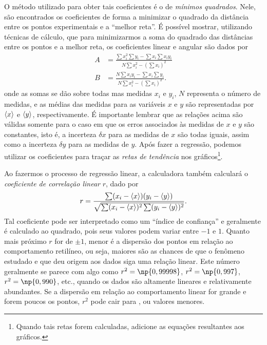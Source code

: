 O método utilizado para obter tais coeficientes é o de \emph{mínimos quadrados}. Nele, são encontrados os coeficientes de forma a minimizar o quadrado da distância entre os pontos experimentais e a ``melhor reta''. É possível mostrar\cite{Taylor}, utilizando técnicas de cálculo, que para minimizarmos a soma do quadrado das distâncias entre os pontos e a melhor reta, os coeficientes linear e angular são dados por
\begin{align}
	A &= \frac{\sum x_i^2 \sum y_i - \sum x_i \sum x_iy_i}{N \sum x_i^2 - (\sum x_i)^2} \\
	B &= \frac{N\sum x_iy_i - \sum x_i \sum y_i}{N \sum x_i^2 - (\sum x_i)^2}.
\end{align}
%
onde as somas se dão sobre todas mas medidas $x_i$ e $y_i$, $N$ representa o número de medidas, e as médias das medidas para as variáveis $x$ e $y$ são representadas por $\left\langle{x}\right\rangle$ e $\left\langle{y}\right\rangle$, respectivamente. É importante lembrar que as relações acima são válidas somente para o caso em que os erros associados às medidas de $x$ e $y$ são constantes, isto é, a incerteza $\delta x$ para as medidas de $x$ são todas iguais, assim como a incerteza $\delta y$ para as medidas de $y$. Após fazer a regressão, podemos utilizar os coeficientes para traçar as \emph{retas de tendência} nos gráficos\footnote{Quando tais retas forem calculadas, adicione as equações resultantes aos gráficos.}.

Ao fazermos o processo de regressão linear, a calculadora também calculará o \emph{coeficiente de correlação linear} $r$, dado por
\begin{equation}
	r = \frac{\sum (x_i - \left\langle{x}\right\rangle)(y_i-\left\langle{y}\right\rangle)}{\sqrt{\sum(x_i - \left\langle{x}\right\rangle)^2\sum (y_i - \left\langle{y}\right\rangle)^2}}.
\end{equation}
%
Tal coeficiente pode ser interpretado como um ``índice de confiança'' e geralmente é calculado ao quadrado, pois seus valores podem variar entre $-1$ e $1$. Quanto mais próximo $r$ for de $\pm 1$, menor é a dispersão dos pontos em relação ao comportamento retilíneo, ou seja, maiores são as chances de que o fenômeno estudado e que deu origem aos dados siga uma relação linear. Este número geralmente se parece com algo como $r^2=\np{0,99998}$, $r^2=\np{0,997}$, $r^2= \np{0,990}$, etc., quando os dados são altamente lineares e relativamente abundantes. Se a dispersão em relação ao comportamento linear for grande e forem poucos os pontos, $r^2$ pode cair para , ou valores menores.

